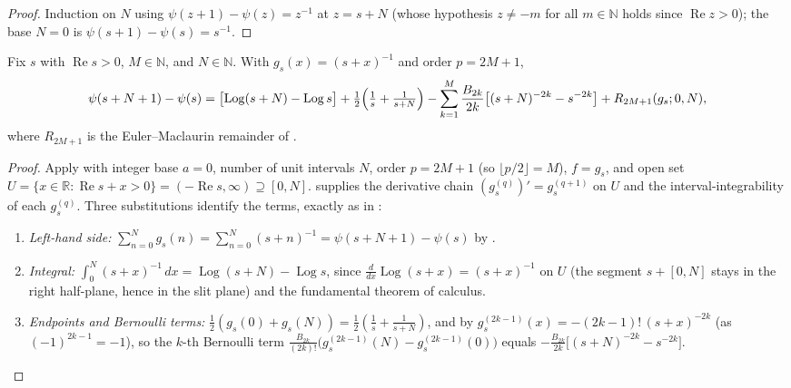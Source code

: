 \begin{proof}
\leanok
Induction on $N$ using $\psi(z+1)-\psi(z)=z^{-1}$ at $z=s+N$ (whose hypothesis
$z\neq-m$ for all $m\in\mathbb{N}$ holds since $\operatorname{Re}z>0$); the base
$N=0$ is $\psi(s+1)-\psi(s)=s^{-1}$.
\end{proof}

\begin{lemma}
\label{lem:gs_sum_em}
\leanok
{}
Fix $s$ with $\operatorname{Re}s>0$, $M\in\mathbb{N}$, and $N\in\mathbb{N}$. With
$g_s(x)=(s+x)^{-1}$ and order $p=2M+1$,
\[
  \psi(s+N+1)-\psi(s)
  = \bigl[\operatorname{Log}(s+N)-\operatorname{Log}s\bigr]
    + \tfrac12\Bigl(\tfrac1s+\tfrac1{s+N}\Bigr)
    - \sum_{k=1}^{M}\frac{B_{2k}}{2k}\bigl[(s+N)^{-2k}-s^{-2k}\bigr]
    + R_{2M+1}(g_s;0,N),
\]
where $R_{2M+1}$ is the Euler--Maclaurin remainder of .
\end{lemma}

\begin{proof}
\leanok
{}
Apply  with integer base $a=0$, number of unit intervals
$N$, order $p=2M+1$ (so $\lfloor p/2\rfloor=M$), $f=g_s$, and open set
$U=\{x\in\mathbb{R}:\operatorname{Re}s+x>0\}=(-\operatorname{Re}s,\infty)\supseteq[0,N]$.
 supplies the derivative chain $(g_s^{(q)})'=g_s^{(q+1)}$
on $U$ and  the interval-integrability of each
$g_s^{(q)}$. Three substitutions identify the terms, exactly as in
:
\begin{enumerate}
\item \emph{Left-hand side:} $\sum_{n=0}^{N}g_s(n)=\sum_{n=0}^{N}(s+n)^{-1}
  =\psi(s+N+1)-\psi(s)$ by .
\item \emph{Integral:} $\int_0^N(s+x)^{-1}\,dx=\operatorname{Log}(s+N)-\operatorname{Log}s$,
  since $\frac{d}{dx}\operatorname{Log}(s+x)=(s+x)^{-1}$ on $U$ (the segment
  $s+[0,N]$ stays in the right half-plane, hence in the slit plane) and the
  fundamental theorem of calculus.
\item \emph{Endpoints and Bernoulli terms:} $\tfrac12(g_s(0)+g_s(N))
  =\tfrac12(\tfrac1s+\tfrac1{s+N})$, and by 
  $g_s^{(2k-1)}(x)=-(2k-1)!\,(s+x)^{-2k}$ (as $(-1)^{2k-1}=-1$), so the $k$-th
  Bernoulli term $\frac{B_{2k}}{(2k)!}\bigl(g_s^{(2k-1)}(N)-g_s^{(2k-1)}(0)\bigr)$
  equals $-\frac{B_{2k}}{2k}\bigl[(s+N)^{-2k}-s^{-2k}\bigr]$.
\end{enumerate}
\end{proof}

